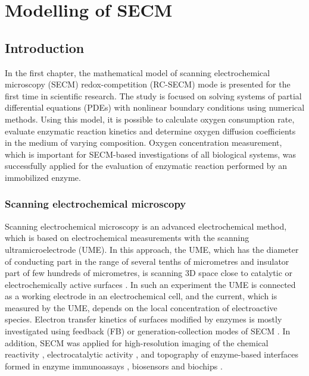 \chapter{Modelling of SECM}
\label{cha:reaction}



\section{Introduction}

In the first chapter, the mathematical model of scanning electrochemical microscopy (SECM) redox-competition (RC-SECM) mode is presented for the first time in scientific research. The study is focused on solving systems of partial differential equations (PDEs) with nonlinear boundary conditions using numerical methods. Using this model, it is possible to calculate oxygen consumption rate, evaluate enzymatic reaction kinetics and determine oxygen diffusion coefficients in the medium of varying composition. Oxygen concentration measurement, which is important for SECM-based investigations of all biological systems, was successfully applied for the evaluation of enzymatic reaction performed by an immobilized enzyme. 


\subsection*{Scanning electrochemical microscopy}

Scanning electrochemical microscopy is an advanced electrochemical method, which is based on electrochemical measurements with the scanning ultramicroelectrode (UME). In this approach, the UME, which has the diameter of conducting part in the range of several tenths of micrometres and insulator part of few hundreds of micrometres, is scanning 3D space close to catalytic or electrochemically active surfaces \cite{bard1989scanning}. In such an experiment the UME is connected as a working electrode in an electrochemical cell, and the current, which is measured by the UME, depends on the local concentration of electroactive species. Electron transfer kinetics of surfaces modified by enzymes is mostly investigated using feedback (FB) or generation-collection modes of SECM \cite{pierce1992scanning, evans2005scanning, wilhelm2003analysis, morkvenaite2015scanning}. In addition, SECM was applied for high-resolution imaging of the chemical reactivity \cite{teranishi2011analysis, wittstock2007scanning}, electrocatalytic activity \cite{fernandez2003scanning, ye2011screening, guadagnini2009visualization}, and topography of enzyme-based interfaces formed in enzyme immunoassays \cite{yasukawa2007enzyme}, biosensors and biochips \cite{zhao2005scanning}.  

